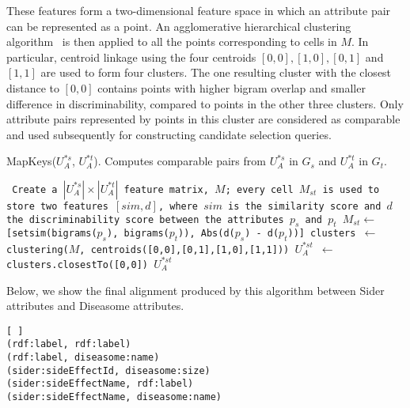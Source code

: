 These features form a two-dimensional feature space in which an attribute pair can be represented as a point. An agglomerative hierarchical clustering algorithm~\cite{DBLP:books/ph/JainD88} is then applied to all the points corresponding to cells in $M$. In particular, centroid linkage using the four centroids $[0,0], [1,0], [0,1]$ and $[1,1]$ are used to form four clusters. The one resulting cluster with the closest distance to $[0,0]$ contains points with higher bigram overlap and smaller difference in discriminability, compared to points in the other three clusters. Only attribute pairs represented by points in this cluster are considered as comparable and used subsequently for constructing candidate selection queries. 
  

\begin{algorithm}
\caption{MapKeys($U^{*s}_A$, $U^{*t}_A$). Computes comparable pairs from $U^{*s}_A$ in $G_s$ and $U^{*t}_A$ in $G_t$.}
\begin{algorithmic}
\scriptsize\tt
\STATE Create a $|U^{*s}_A|\times|U^{*t}_A|$ feature matrix, $M$; every cell $M_{st}$ is used to store two features $[sim,d]$, where $sim$ is the similarity score and $d$ the discriminability score between the attributes $p_s$ and $p_t$
\STATE $M_{st} \leftarrow$ [setsim(bigrams($p_s$), bigrams($p_t$)), Abs(d($p_s$) - d($p_t$))]
\ENDFOR
\ENDFOR
\STATE clusters $\leftarrow$ clustering($M$, centroids([0,0],[0,1],[1,0],[1,1]))
\STATE $U^{*st}_A$ $\leftarrow$ clusters.closestTo([0,0])
\RETURN $U^{*st}_A$
\end{algorithmic}
\end{algorithm}

Below, we show the final alignment  produced by this algorithm between Sider attributes and Diseasome attributes.
\lstset{basicstyle=\small}
\begin{lstlisting}[ ]   
(rdf:label, rdf:label)
(rdf:label, diseasome:name)
(sider:sideEffectId, diseasome:size)
(sider:sideEffectName, rdf:label)
(sider:sideEffectName, diseasome:name)
\end{lstlisting}